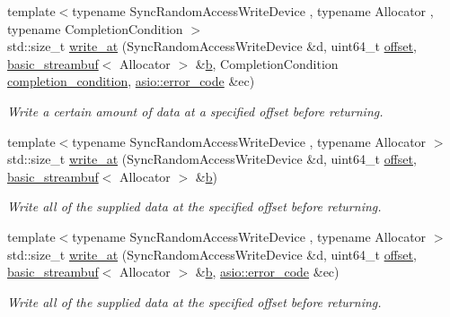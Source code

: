 \begin{DoxyCompactItemize}
{\footnotesize template$<$typename Sync\+Random\+Access\+Write\+Device , typename Allocator , typename Completion\+Condition $>$ }\\std\+::size\+\_\+t \hyperlink{group__write__at_ga431966af634f0701ceac7f54fc1b0371}{write\+\_\+at} (Sync\+Random\+Access\+Write\+Device \&d, uint64\+\_\+t \hyperlink{group__async__read__at_ga8dcdb41a4adfd6fe5322b5dd666d9f29}{offset}, \hyperlink{classasio_1_1basic__streambuf}{basic\+\_\+streambuf}$<$ Allocator $>$ \&\hyperlink{group__async__read_ga945a5c18fa77a9e2eba420f8f44b2a4f}{b}, Completion\+Condition \hyperlink{group__async__read_gae2e215d5013596cc2b385bb6c13fa518}{completion\+\_\+condition}, \hyperlink{classasio_1_1error__code}{asio\+::error\+\_\+code} \&ec)
\begin{DoxyCompactList}\small\item\em Write a certain amount of data at a specified offset before returning. \end{DoxyCompactList}\item 
{\footnotesize template$<$typename Sync\+Random\+Access\+Write\+Device , typename Allocator $>$ }\\std\+::size\+\_\+t \hyperlink{group__write__at_ga1db1f75a907c17918092b41f2f242104}{write\+\_\+at} (Sync\+Random\+Access\+Write\+Device \&d, uint64\+\_\+t \hyperlink{group__async__read__at_ga8dcdb41a4adfd6fe5322b5dd666d9f29}{offset}, \hyperlink{classasio_1_1basic__streambuf}{basic\+\_\+streambuf}$<$ Allocator $>$ \&\hyperlink{group__async__read_ga945a5c18fa77a9e2eba420f8f44b2a4f}{b})
\begin{DoxyCompactList}\small\item\em Write all of the supplied data at the specified offset before returning. \end{DoxyCompactList}\item 
{\footnotesize template$<$typename Sync\+Random\+Access\+Write\+Device , typename Allocator $>$ }\\std\+::size\+\_\+t \hyperlink{group__write__at_gaa6f42435acf937c35ee4c81af44ee6ce}{write\+\_\+at} (Sync\+Random\+Access\+Write\+Device \&d, uint64\+\_\+t \hyperlink{group__async__read__at_ga8dcdb41a4adfd6fe5322b5dd666d9f29}{offset}, \hyperlink{classasio_1_1basic__streambuf}{basic\+\_\+streambuf}$<$ Allocator $>$ \&\hyperlink{group__async__read_ga945a5c18fa77a9e2eba420f8f44b2a4f}{b}, \hyperlink{classasio_1_1error__code}{asio\+::error\+\_\+code} \&ec)
\begin{DoxyCompactList}\small\item\em Write all of the supplied data at the specified offset before returning. \end{DoxyCompactList}\item 

\end{DoxyCompactItemize}
